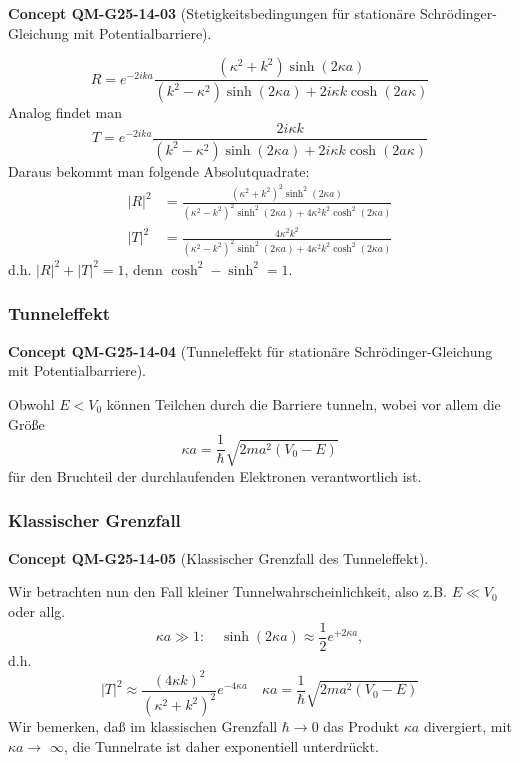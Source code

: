 \documentclass[10pt, letterpaper]{article}
\newcommand{\CustomHeading}[3]{%
  \par\medskip\noindent%
  \textbf{#1 #2} \textnormal{(#3)}.\enskip%
}
\newenvironment{CONC}[2]{\begin{unitbox}\CustomHeading{Concept}{#1}{#2}}{\end{unitbox}}
\begin{document}
\begin{CONC}{QM-G25-14-03}{Stetigkeitsbedingungen für stationäre Schrödinger-Gleichung mit Potentialbarriere}
$$
R=e^{-2 i k a} \frac{\left(\kappa^{2}+k^{2}\right) \sinh (2 \kappa a)}{\left(k^{2}-\kappa^{2}\right) \sinh (2 \kappa a)+2 i \kappa k \cosh (2 a \kappa)}
$$
Analog findet man
$$
T=e^{-2 i k a} \frac{2 i \kappa k}{\left(k^{2}-\kappa^{2}\right) \sinh (2 \kappa a)+2 i \kappa k \cosh (2 a \kappa)}
$$
Daraus bekommt man folgende Absolutquadrate:
$$
\begin{aligned}
|R|^{2} & =\frac{\left(\kappa^{2}+k^{2}\right)^{2} \sinh ^{2}(2 \kappa a)}{\left(\kappa^{2}-k^{2}\right)^{2} \sinh ^{2}(2 \kappa a)+4 \kappa^{2} k^{2} \cosh ^{2}(2 \kappa a)} \\
|T|^{2} & =\frac{4 \kappa^{2} k^{2}}{\left(\kappa^{2}-k^{2}\right)^{2} \sinh ^{2}(2 \kappa a)+4 \kappa^{2} k^{2} \cosh ^{2}(2 \kappa a)}
\end{aligned}
$$
d.h. $|R|^{2}+|T|^{2}=1$, denn $\cosh ^{2}-\sinh ^{2}=1$.
\end{CONC}



\subsubsection*{Tunneleffekt}


\begin{CONC}{QM-G25-14-04}{Tunneleffekt für stationäre Schrödinger-Gleichung mit Potentialbarriere}
Obwohl $E<V_{0}$ können Teilchen durch die Barriere tunneln, wobei vor allem die Größe
$$
\kappa a=\frac{1}{\hbar} \sqrt{2 m a^{2}\left(V_{0}-E\right)}
$$
für den Bruchteil der durchlaufenden Elektronen verantwortlich ist.
\end{CONC}


\subsubsection*{Klassischer Grenzfall}


\begin{CONC}{QM-G25-14-05}{Klassischer Grenzfall des Tunneleffekt}
Wir betrachten nun den Fall kleiner Tunnelwahrscheinlichkeit, also z.B. $E \ll V_{0}$ oder allg.
$$
\kappa a \gg 1: \quad \sinh (2 \kappa a) \approx \frac{1}{2} e^{+2 \kappa a},
$$
d.h.
$$
|T|^{2} \approx \frac{(4 \kappa k)^{2}}{\left(\kappa^{2}+k^{2}\right)^{2}} e^{-4 \kappa a} \quad \kappa a=\frac{1}{\hbar} \sqrt{2 m a^{2}\left(V_{0}-E\right)}
$$
Wir bemerken, daß im klassischen Grenzfall $\hbar \rightarrow 0$ das Produkt $\kappa a$ divergiert, mit $\kappa a \rightarrow$ $\infty$, die Tunnelrate ist daher exponentiell unterdrückt.
\end{CONC}
\end{document}
